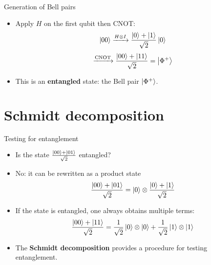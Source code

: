 \documentclass[aspectratio=169,12pt]{beamer}
\begin{document}
\begin{frame}{Generation of Bell pairs}
    \begin{itemize}[<+->]
      \setlength{\itemsep}{0.55em}
      \item Apply $H$ on the first qubit then CNOT:
      $$\ket{00} \xrightarrow{H\otimes I} \frac{\ket{0}+\ket{1}}{\sqrt{2}}\ket{0}$$
      $$\xrightarrow{\text{CNOT}} \frac{\ket{00}+\ket{11}}{\sqrt{2}} = \ket{\Phi^+}$$
      \item This is an \textbf{entangled} state: the Bell pair $\ket{\Phi^+}$.
    \end{itemize}
\end{frame}

\section{Schmidt decomposition}

\begin{frame}{Testing for entanglement}
  \begin{itemize}[<+->]
    \item Is the state $\frac{\ket{00} + \ket{01}}{\sqrt{2}}$ entangled? 
    \item No: it can be rewritten as a product state
    \begin{equation*}
      \frac{\ket{00} + \ket{01}}{\sqrt{2}} = \ket{0} \otimes \frac{\ket{0}+\ket{1}}{\sqrt{2}}
    \end{equation*} 
    \item If the state is entangled, one always obtains multiple terms:
    \begin{equation*}
      \frac{\ket{00} + \ket{11}}{\sqrt{2}} = \frac{1}{\sqrt{2}} \ket{0} \otimes \ket{0} + \frac{1}{\sqrt{2}} \ket{1} \otimes \ket{1}
    \end{equation*}
    \item The \textbf{Schmidt decomposition} provides a procedure for testing entanglement.
  \end{itemize}
\end{frame}
\end{document}
